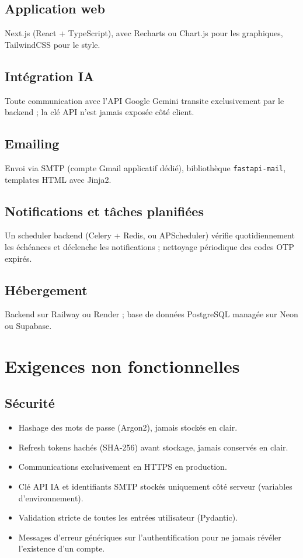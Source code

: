 \documentclass[11pt,a4paper]{article}
\begin{document}
\subsection{Application web}
Next.js (React + TypeScript), avec Recharts ou Chart.js pour les graphiques, TailwindCSS pour le style.

\subsection{Intégration IA}
Toute communication avec l'API Google Gemini transite exclusivement par le backend ; la clé API n'est jamais exposée côté client.

\subsection{Emailing}
Envoi via SMTP (compte Gmail applicatif dédié), bibliothèque \texttt{fastapi-mail}, templates HTML avec Jinja2.

\subsection{Notifications et tâches planifiées}
Un scheduler backend (Celery + Redis, ou APScheduler) vérifie quotidiennement les échéances et déclenche les notifications ; nettoyage périodique des codes OTP expirés.

\subsection{Hébergement}
Backend sur Railway ou Render ; base de données PostgreSQL managée sur Neon ou Supabase.

\section{Exigences non fonctionnelles}

\subsection{Sécurité}
\begin{itemize}[leftmargin=*]
    \item Hashage des mots de passe (Argon2), jamais stockés en clair.
    \item Refresh tokens hachés (SHA-256) avant stockage, jamais conservés en clair.
    \item Communications exclusivement en HTTPS en production.
    \item Clé API IA et identifiants SMTP stockés uniquement côté serveur (variables d'environnement).
    \item Validation stricte de toutes les entrées utilisateur (Pydantic).
    \item Messages d'erreur génériques sur l'authentification pour ne jamais révéler l'existence d'un compte.
\end{itemize}
\end{document}
